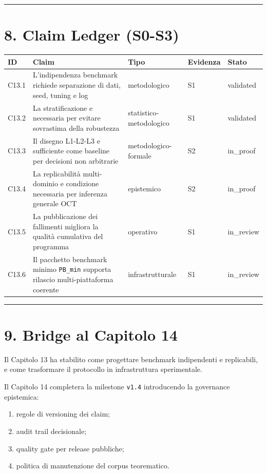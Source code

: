 \begin{center}\rule{0.5\linewidth}{0.5pt}\end{center}

\section{8. Claim Ledger (S0-S3)}

{\def\LTcaptype{none} %
\begin{longtable}[]{@{}lllll@{}}
\toprule\noalign{}
ID & Claim & Tipo & Evidenza & Stato \\
\midrule\noalign{}
\endhead
\bottomrule\noalign{}
\endlastfoot
C13.1 & L'indipendenza benchmark richiede separazione di dati, seed, tuning e log & metodologico & S1 & validated \\
C13.2 & La stratificazione e necessaria per evitare sovrastima della robustezza & statistico-metodologico & S1 & validated \\
C13.3 & Il disegno L1-L2-L3 e sufficiente come baseline per decisioni non arbitrarie & metodologico-formale & S2 & in\_proof \\
C13.4 & La replicabilità multi-dominio e condizione necessaria per inferenza generale OCT & epistemico & S2 & in\_proof \\
C13.5 & La pubblicazione dei fallimenti migliora la qualità cumulativa del programma & operativo & S1 & in\_review \\
C13.6 & Il pacchetto benchmark minimo \texttt{PB\_min} supporta rilascio multi-piattaforma coerente & infrastrutturale & S1 & in\_review \\
\end{longtable}
}

\begin{center}\rule{0.5\linewidth}{0.5pt}\end{center}

\section{9. Bridge al Capitolo 14}

Il Capitolo 13 ha stabilito come progettare benchmark indipendenti e replicabili, e come trasformare il protocollo in infrastruttura sperimentale.

Il Capitolo 14 completera la milestone \texttt{v1.4} introducendo la governance epistemica:

\begin{enumerate}
\def\labelenumi{\arabic{enumi}.}
\tightlist
\item
  regole di versioning dei claim;
\item
  audit trail decisionale;
\item
  quality gate per release pubbliche;
\item
  politica di manutenzione del corpus teorematico.
\end{enumerate}

